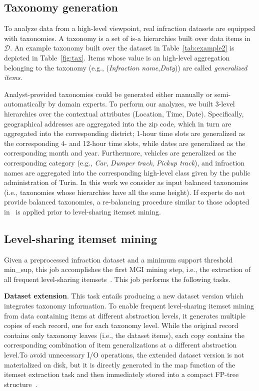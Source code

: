 \documentclass[10pt, conference, compsocconf]{IEEEtran}
\begin{document}
\subsection{Taxonomy generation}
\label{taxmapping}

To analyze data from a high-level viewpoint, real infraction datasets are equipped with taxonomies.
A taxonomy is a set of is-a hierarchies built over data items in $\mathcal{D}$. 
An example taxonomy built over the dataset in Table~\ref{tab:example2} is depicted in Table~\ref{fig:tax}. 
Items whose value is an high-level aggregation belonging to the taxonomy (e.g., (\textit{Infraction name},\textit{Duty})) are called \textit{generalized items}. 

Analyst-provided taxonomies could be generated either manually or semi-automatically by domain experts. 
To perform our analyzes, we built 3-level hierarchies over the contextual attributes (Location, Time, Date). Specifically, geographical addresses 
are aggregated into the zip code, which in turn are aggregated into the corresponding district; 1-hour time slots are generalized as the corresponding 4- and 12-hour time slots, 
while dates are generalized as the corresponding month and year.
Furthermore, vehicles are generalized as the corresponding category (e.g., \textit{Car}, \textit{Dumper track}, \textit{Pickup track}), and
infraction names are aggregated into the corresponding high-level class given by the public administration of Turin.
In this work we consider as input balanced taxonomies (i.e., taxonomies whose hierarchies have all the same height). 
If experts do not provide balanced taxonomies, a re-balancing procedure similar to those adopted in~\cite{Flipping} is applied prior to level-sharing itemset mining.  


\subsection{Level-sharing itemset mining}
\label{levelsharing}


Given a preprocessed infraction dataset and a minimum support threshold min\_sup, this job accomplishes the first MGI mining step, i.e., the extraction of all frequent level-sharing itemsets~\cite{Han1999}.  
This job performs the following tasks. 

\noindent \textbf{Dataset extension}. This task entails producing a new dataset version which integrates taxonomy information. 
To enable frequent level-sharing itemset mining from data containing items at different abstraction levels, it generates multiple copies of each record, one for each taxonomy level. 
While the original record contains only taxonomy leaves (i.e., the dataset items), each copy contains the corresponding combination of item generalizations at a different abstraction level.To avoid unnecessary I/O operations, the extended dataset version is not materialized on disk, but it is directly 
generated in the map function of the itemset extraction task and then immediately stored into a compact FP-tree structure~\cite{KumarBook}.
\end{document}
